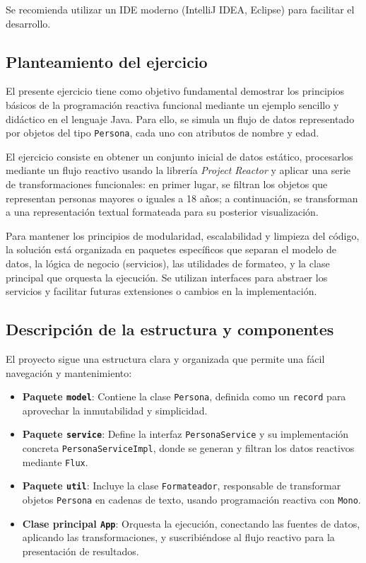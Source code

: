 Se recomienda utilizar un IDE moderno (IntelliJ IDEA, Eclipse) para facilitar el desarrollo.

\subsection{Planteamiento del ejercicio}

El presente ejercicio tiene como objetivo fundamental demostrar los principios básicos de la programación reactiva funcional mediante un ejemplo sencillo y didáctico en el lenguaje Java. Para ello, se simula un flujo de datos representado por objetos del tipo \texttt{Persona}, cada uno con atributos de nombre y edad.

El ejercicio consiste en obtener un conjunto inicial de datos estático, procesarlos mediante un flujo reactivo usando la librería \textit{Project Reactor} y aplicar una serie de transformaciones funcionales: en primer lugar, se filtran los objetos que representan personas mayores o iguales a 18 años; a continuación, se transforman a una representación textual formateada para su posterior visualización.

Para mantener los principios de modularidad, escalabilidad y limpieza del código, la solución está organizada en paquetes específicos que separan el modelo de datos, la lógica de negocio (servicios), las utilidades de formateo, y la clase principal que orquesta la ejecución. Se utilizan interfaces para abstraer los servicios y facilitar futuras extensiones o cambios en la implementación.

\subsection{Descripción de la estructura y componentes}

El proyecto sigue una estructura clara y organizada que permite una fácil navegación y mantenimiento:

\begin{itemize}
    \item \textbf{Paquete \texttt{model}}: Contiene la clase \texttt{Persona}, definida como un \texttt{record} para aprovechar la inmutabilidad y simplicidad.
    \item \textbf{Paquete \texttt{service}}: Define la interfaz \texttt{PersonaService} y su implementación concreta \texttt{PersonaServiceImpl}, donde se generan y filtran los datos reactivos mediante \texttt{Flux}.
    \item \textbf{Paquete \texttt{util}}: Incluye la clase \texttt{Formateador}, responsable de transformar objetos \texttt{Persona} en cadenas de texto, usando programación reactiva con \texttt{Mono}.
    \item \textbf{Clase principal \texttt{App}}: Orquesta la ejecución, conectando las fuentes de datos, aplicando las transformaciones, y suscribiéndose al flujo reactivo para la presentación de resultados.
\end{itemize}

